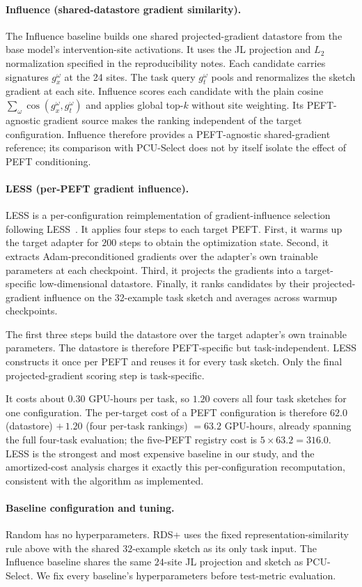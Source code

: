 \paragraph{Influence (shared-datastore gradient similarity).}
The Influence baseline builds one shared projected-gradient datastore from the
base model's intervention-site activations. It uses the JL projection and $L_2$
normalization specified in the reproducibility notes. Each candidate carries
signatures $g_x^\omega$ at the 24 sites. The task query $g_t^\omega$ pools and
renormalizes the sketch gradient at each site. Influence scores each candidate
with the plain cosine $\sum_{\omega}\cos(g_x^\omega, g_t^\omega)$ and applies
global top-$k$ without site weighting. Its PEFT-agnostic gradient source makes
the ranking independent of the target configuration. Influence therefore
provides a PEFT-agnostic shared-gradient reference; its comparison with
PCU-Select does not by itself isolate the effect of PEFT conditioning.

\paragraph{LESS (per-PEFT gradient influence).}
LESS is a per-configuration reimplementation of gradient-influence selection
following LESS~\cite{xia2024less}. It applies four steps to each target PEFT.
First, it warms up the target adapter for $200$ steps to obtain the optimization
state. Second, it extracts Adam-preconditioned gradients over the adapter's own
trainable parameters at each checkpoint. Third, it projects the gradients into a
target-specific low-dimensional datastore. Finally, it ranks candidates by their
projected-gradient influence on the 32-example task sketch and averages across
warmup checkpoints.

The first three steps build the datastore over the target adapter's own
trainable parameters. The datastore is therefore PEFT-specific but
task-independent. LESS constructs it once per PEFT and reuses it for every task
sketch. Only the final projected-gradient scoring step is task-specific.

It costs about $0.30$ GPU-hours per task, so $1.20$ covers all four task sketches
for one configuration. The per-target cost of a PEFT configuration is therefore
$62.0$ (datastore) $+\,1.20$ (four per-task rankings) $=63.2$ GPU-hours, already
spanning the full four-task evaluation; the five-PEFT registry cost is
$5\times63.2=316.0$. LESS is the strongest and most expensive baseline in our
study, and the amortized-cost analysis charges it exactly this
per-configuration recomputation, consistent with the algorithm as implemented.

\paragraph{Baseline configuration and tuning.}
Random has no hyperparameters. RDS+ uses the fixed representation-similarity
rule above with the shared $32$-example sketch as its only task input. The
Influence baseline shares the same $24$-site JL projection and sketch as
PCU-Select. We fix every baseline's hyperparameters before test-metric
evaluation.
